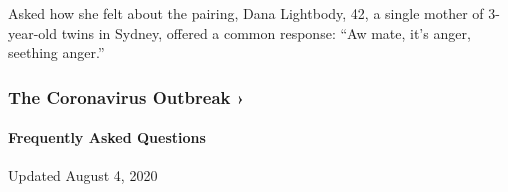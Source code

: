 Asked how she felt about the pairing, Dana Lightbody, 42, a single
mother of 3-year-old twins in Sydney, offered a common response: ``Aw
mate, it's anger, seething anger.''

\href{https://www.nytimes3xbfgragh.onion/news-event/coronavirus?action=click\&pgtype=Article\&state=default\&region=MAIN_CONTENT_3\&context=storylines_faq}{}

\hypertarget{the-coronavirus-outbreak-}{%
\subsubsection{The Coronavirus Outbreak
›}\label{the-coronavirus-outbreak-}}

\hypertarget{frequently-asked-questions}{%
\paragraph{Frequently Asked
Questions}\label{frequently-asked-questions}}

Updated August 4, 2020

